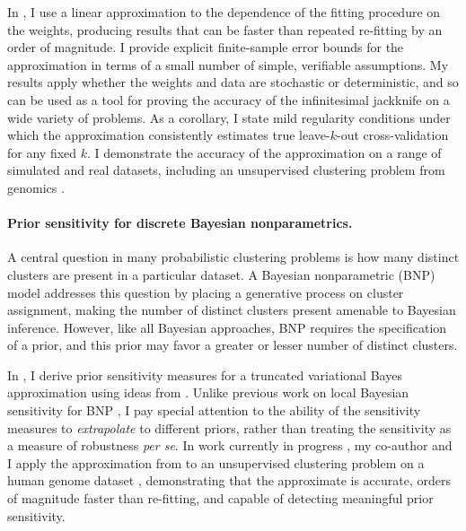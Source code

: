 In \citet{giordano:2019:ij}, I use a linear approximation to the
dependence of the fitting procedure on the weights, producing results that can
be faster than repeated re-fitting by an order of magnitude. I provide explicit
finite-sample error bounds for the approximation in terms of a small number of
simple, verifiable assumptions.  My results apply whether the weights and data
are stochastic or deterministic, and so can be used as a tool for proving the
accuracy of the infinitesimal jackknife on a wide variety of problems. As a
corollary, I state mild regularity conditions under which the approximation
consistently estimates true leave-$k$-out cross-validation for any fixed $k$. I
demonstrate the accuracy of the approximation on a range of simulated and real
datasets, including an unsupervised clustering problem from genomics
\citep{Luan:2003:clustering, shoemaker:2015:ultrasensitive}.


\paragraph{Prior sensitivity for discrete Bayesian nonparametrics.}

A central question in many probabilistic clustering problems is how many
distinct clusters are present in a particular dataset. A Bayesian nonparametric
(BNP) model addresses this question by placing a generative process on cluster
assignment, making the number of distinct clusters present amenable to Bayesian
inference.  However, like all Bayesian approaches, BNP requires the
specification of a prior, and this prior may favor a greater or lesser number of
distinct clusters.

In \citep{giordano:2018:bnpsensitivity}, I derive prior sensitivity measures for
a truncated variational Bayes approximation using ideas from
\citep{gustafson:1996:localposterior, giordano:2018:covariances}. Unlike
previous work on local Bayesian sensitivity for BNP
\citep{Basu:2000:BNP_robustness}, I pay special attention to the ability of the
sensitivity measures to \emph{extrapolate} to different priors, rather than
treating the sensitivity as a measure of robustness \textit{per se}. In work
currently in progress \citep{liu:2020:bnpjisba}, my co-author and I apply the
approximation from \citep{giordano:2018:bnpsensitivity} to an unsupervised
clustering problem on a human genome dataset \citep{huang:2011:haplotype,
raj:2014:faststructure}, demonstrating that the approximate is accurate, orders
of magnitude faster than re-fitting, and capable of detecting meaningful prior
sensitivity.


